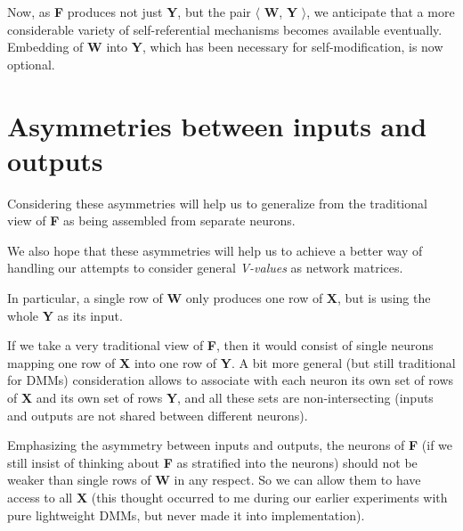 \documentclass{article}
\begin{document}
\smallskip

Now, as {\bf F} produces not just {\bf Y}, but the pair $\langle\!\!$ {\bf W}, {\bf Y} $\!\!\rangle$, we anticipate that
a more considerable variety of self-referential mechanisms becomes available eventually. Embedding of {\bf W} into {\bf Y}, which has been necessary for self-modification, is now optional.

\section{Asymmetries between inputs and outputs}

Considering these asymmetries will help us to generalize from the traditional view of {\bf F} as being assembled from separate neurons.

\smallskip

We also hope that these asymmetries will help us to achieve a better way of handling our attempts to 
consider general {\em V-values} as network matrices.

\bigskip

In particular, a single row of {\bf W} only produces one row of {\bf X}, but is using the whole {\bf Y} as its input.

\smallskip

If we take a very traditional view of {\bf F}, then it would consist of single neurons mapping one row of {\bf X} into one row of {\bf Y}. A bit more general (but still traditional for DMMs) consideration allows to associate with each neuron its own set of rows of {\bf X} and its own set of rows {\bf Y}, and all these sets are non-intersecting (inputs and outputs are not shared between different neurons). 

\bigskip

Emphasizing the asymmetry between inputs and outputs, the neurons of {\bf F} (if we still insist of thinking about {\bf F}
as stratified into the neurons) should not be weaker than single rows of {\bf W} in any respect. So we can allow them to have
access to all {\bf X} (this thought occurred to me during our earlier experiments with pure lightweight DMMs, 
but never made it into implementation).
\end{document}
